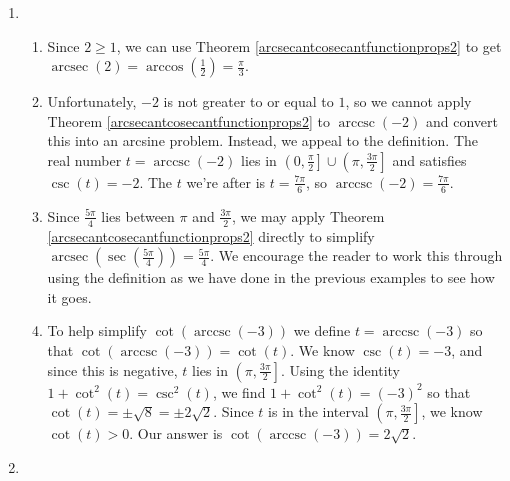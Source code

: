 {
\begin{enumerate}
\item
\begin{enumerate}

\item  Since $2 \geq 1$, we can use Theorem \ref{arcsecantcosecantfunctionprops2} to get $\operatorname{arcsec}(2) = \arccos\left(\frac{1}{2}\right) = \frac{\pi}{3}$.

\item  Unfortunately, $-2$ is not greater to or equal to $1$, so we cannot apply Theorem \ref{arcsecantcosecantfunctionprops2} to  $\operatorname{arccsc}(-2)$ and convert this into an arcsine problem.  Instead, we appeal to the definition.  The real number $t = \operatorname{arccsc}(-2)$ lies in $\left(0,\frac{\pi}{2} \right] \cup \left(\pi, \frac{3\pi}{2}\right]$ and satisfies $\csc(t) = -2$.  The $t$ we're after is $t = \frac{7\pi}{6}$, so $\operatorname{arccsc}(-2) = \frac{7\pi}{6}$.

\item  Since $\frac{5\pi}{4}$ lies between $\pi$ and $\frac{3\pi}{2}$, we may apply Theorem \ref{arcsecantcosecantfunctionprops2} directly to simplify $\operatorname{arcsec}\left( \sec\left( \frac{5\pi}{4} \right) \right) = \frac{5\pi}{4}$.  We encourage the reader to work this through using the definition as we have done in the  previous examples to see how it goes.

\item  To help simplify $\cot\left(\operatorname{arccsc}\left(-3\right)\right)$ we define $t = \operatorname{arccsc}\left(-3\right)$ so that  $\cot\left(\operatorname{arccsc}\left(-3\right)\right) = \cot(t)$.  We know $\csc(t) = -3$, and since this is negative,  $t$ lies in $\left( \pi, \frac{3\pi}{2}\right]$.  Using the identity $1 + \cot^{2}(t) = \csc^{2}(t)$, we find $1 + \cot^{2}(t) = (-3)^2$ so that $\cot(t) = \pm \sqrt{8} = \pm 2 \sqrt{2}$.  Since $t$ is in the interval $\left(\pi, \frac{3\pi}{2}\right]$, we know $\cot(t) > 0$.  Our answer is $\cot\left(\operatorname{arccsc}\left(-3\right)\right) = 2 \sqrt{2}$.

\end{enumerate}

\drawexampleline

\item 
\begin{enumerate}


\end{enumerate}
\end{enumerate}}
